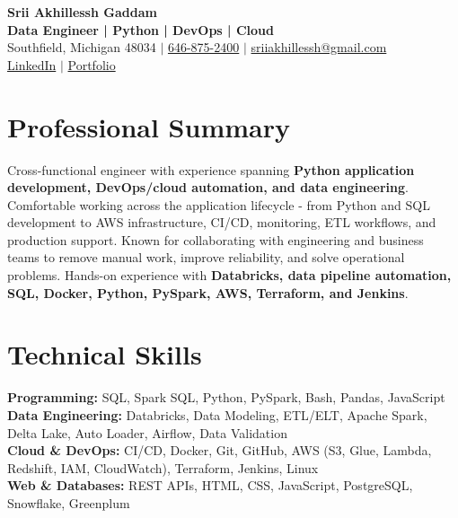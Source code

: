 \documentclass[letterpaper,10pt]{article}
\begin{document}
\fontsize{9.35pt}{10.45pt}\selectfont

\begin{center}
    {\LARGE \textbf{Srii Akhillessh Gaddam}} \\[-1pt]
    \textbf{Data Engineer | Python | DevOps | Cloud} \\[2pt]
    Southfield, Michigan 48034 $|$
    \href{tel:6468752400}{646-875-2400} $|$
    \href{mailto:sriiakhillessh@gmail.com}{sriiakhillessh@gmail.com} \\[1pt]
    \href{https://www.linkedin.com/in/srii-akhiilessh-gaddam-b48668191/}{LinkedIn} $|$
    \href{https://sriiakhillesshg.github.io/portfolio/}{Portfolio}
\end{center}
\vspace{-8pt}

\section{Professional Summary}
\small{Cross-functional engineer with experience spanning \textbf{Python application development, DevOps/cloud automation, and data engineering}. Comfortable working across the application lifecycle - from Python and SQL development to AWS infrastructure, CI/CD, monitoring, ETL workflows, and production support. Known for collaborating with engineering and business teams to remove manual work, improve reliability, and solve operational problems. Hands-on experience with \textbf{Databricks, data pipeline automation, SQL, Docker, Python, PySpark, AWS, Terraform, and Jenkins}.}

\section{Technical Skills}
\small{
\textbf{Programming:} SQL, Spark SQL, Python, PySpark, Bash, Pandas, JavaScript \\
\textbf{Data Engineering:} Databricks, Data Modeling, ETL/ELT, Apache Spark, Delta Lake, Auto Loader, Airflow, Data Validation \\
\textbf{Cloud \& DevOps:} CI/CD, Docker, Git, GitHub, AWS (S3, Glue, Lambda, Redshift, IAM, CloudWatch), Terraform, Jenkins, Linux \\
\textbf{Web \& Databases:} REST APIs, HTML, CSS, JavaScript, PostgreSQL, Snowflake, Greenplum
}

\end{document}
